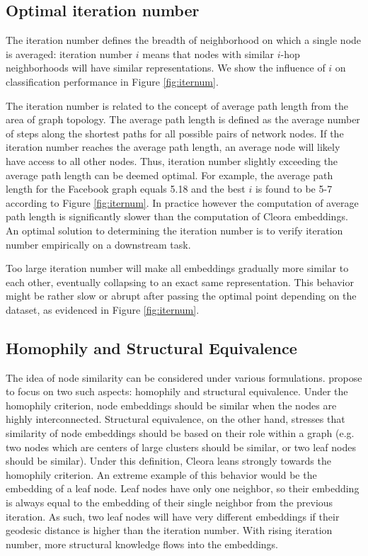 \documentclass{IEEEtran}
\begin{document}
\subsection{Optimal iteration number}
The iteration number defines the breadth of neighborhood on which a single node is averaged: iteration number $i$ means that nodes with similar $i$-hop neighborhoods will have similar representations. We show the influence of $i$ on classification performance in Figure \ref{fig:iternum}.

The iteration number is related to the concept of average path length from the area of graph topology. The average path length is defined as the average number of steps along the shortest paths for all possible pairs of network nodes. If the iteration number reaches the average path length, an average node will likely have access to all other nodes. Thus, iteration number slightly exceeding the average path length can be deemed optimal. For example, the average path length for the Facebook graph equals 5.18 and the best $i$ is found to be 5-7 according to Figure \ref{fig:iternum}. In practice however the computation of average path length is significantly slower than the computation of Cleora embeddings. An optimal solution to determining the iteration number is to verify iteration number empirically on a downstream task. 

Too large iteration number will make all embeddings gradually more similar to each other, eventually collapsing to an exact same representation. This behavior might be rather slow or abrupt after passing the optimal point depending on the dataset, as evidenced in Figure \ref{fig:iternum}.

\subsection{Homophily and Structural Equivalence}
The idea of node similarity can be considered under various formulations. \cite{grover2016node2vec} propose to focus on two such aspects: homophily \cite{doi:10.1146/annurev.soc.27.1.415} and structural equivalence. Under the homophily criterion, node embeddings should be similar when the nodes are highly interconnected. Structural equivalence, on the other hand, stresses that similarity of node embeddings should be based on their role within a graph (e.g. two nodes which are centers of large clusters should be similar, or two leaf nodes should be similar). Under this definition, Cleora leans strongly towards the homophily criterion. An extreme example of this behavior would be the embedding of a leaf node. Leaf nodes have only one neighbor, so their embedding is always equal to the embedding of their single neighbor from the previous iteration. As such, two leaf nodes will have very different embeddings if their geodesic distance is higher than the iteration number. With rising iteration number, more structural knowledge flows into the embeddings.
\end{document}
